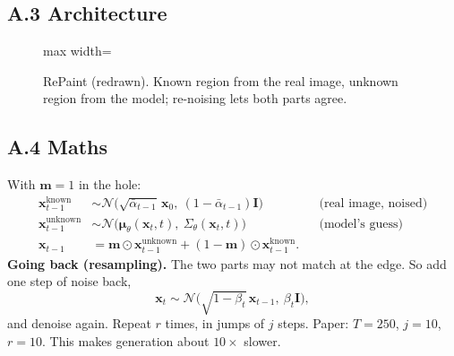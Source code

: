 \documentclass[11pt,a4paper,oneside]{report}
\newcommand{\x}{\bm{x}}
\newcommand{\m}{\bm{m}}
\newcommand{\eps}{\bm{\epsilon}}
\newcommand{\N}{\mathcal{N}}
\newcommand{\abar}{\bar{\alpha}}
\newcommand{\I}{\bm{I}}
\newcommand{\had}{\odot}
\begin{document}
\subsection*{A.3 Architecture}
\begin{figure}[H]
\centering
\begin{adjustbox}{max width=\linewidth}
\end{adjustbox}
\caption{RePaint (redrawn). Known region from the real image, unknown region from the model; re-noising lets both parts agree.}
\end{figure}


\subsection*{A.4 Maths}
With $\m=1$ in the hole:
\begin{align}
\x_{t-1}^{\text{known}} &\sim \N\big(\sqrt{\abar_{t-1}}\,\x_0,\ (1-\abar_{t-1})\I\big) && \text{(real image, noised)}\\
\x_{t-1}^{\text{unknown}} &\sim \N\big(\bm\mu_\theta(\x_t,t),\ \Sigma_\theta(\x_t,t)\big) && \text{(model's guess)}\\
\x_{t-1} &= \m\had\x_{t-1}^{\text{unknown}} + (1-\m)\had\x_{t-1}^{\text{known}} .
\end{align}
\textbf{Going back (resampling).} The two parts may not match at the edge. So add one step of noise back,
\begin{equation}
\x_t \sim \N\big(\sqrt{1-\beta_t}\,\x_{t-1},\ \beta_t\I\big),
\end{equation}
and denoise again. Repeat $r$ times, in jumps of $j$ steps. Paper: $T=250$, $j=10$, $r=10$. This makes generation about $10\times$ slower.
\end{document}
